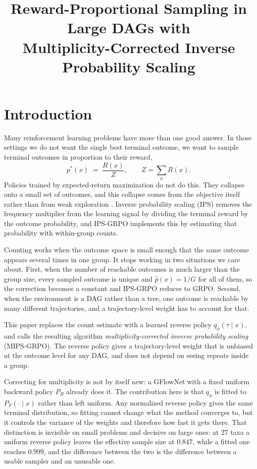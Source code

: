 \documentclass[11pt]{article}
\title{Reward-Proportional Sampling in Large DAGs with\\
Multiplicity-Corrected Inverse Probability Scaling}
\author{}
\date{}
\begin{document}
\maketitle

\section{Introduction}

Many reinforcement learning problems have more than one good answer. In those
settings we do not want the single best terminal outcome, we want to sample
terminal outcomes in proportion to their reward,
\begin{equation}
p^{*}(x) \;=\; \frac{R(x)}{Z}, \qquad Z = \sum_{x} R(x).
\label{eq:target}
\end{equation}
Policies trained by expected-return maximization do not do this. They collapse
onto a small set of outcomes, and this collapse comes from the objective itself
rather than from weak exploration \citep{sinha2026ips}. Inverse probability
scaling (IPS) removes the frequency multiplier from the learning signal by
dividing the terminal reward by the outcome probability, and IPS-GRPO
implements this by estimating that probability with within-group counts.

Counting works when the outcome space is small enough that the same outcome
appears several times in one group. It stops working in two situations we care
about. First, when the number of reachable outcomes is much larger than the
group size, every sampled outcome is unique and $\hat{p}(x)=1/G$ for all of
them, so the correction becomes a constant and IPS-GRPO reduces to GRPO.
Second, when the environment is a DAG rather than a tree, one outcome is
reachable by many different trajectories, and a trajectory-level weight has to
account for that.

This paper replaces the count estimate with a learned reverse policy
$q_\phi(\tau \mid x)$, and calls the resulting algorithm \emph{multiplicity-corrected
inverse probability scaling} (MIPS-GRPO). The reverse policy gives a
trajectory-level weight that is unbiased at the outcome level for any DAG, and
does not depend on seeing repeats inside a group.

Correcting for multiplicity is not by itself new: a GFlowNet with a fixed
uniform backward policy $P_B$ already does it. The contribution here is that
$q_\phi$ is fitted to $P_F(\cdot \mid x)$ rather than left uniform. Any
normalized reverse policy gives the same terminal distribution, so fitting
cannot change what the method converges to, but it controls the variance of the
weights and therefore how fast it gets there. That distinction is invisible on
small problems and decisive on large ones: at 27 taxa a uniform reverse policy
leaves the effective sample size at $0.847$, while a fitted one reaches $0.999$,
and the difference between the two is the difference between a usable sampler
and an unusable one.
\end{document}
